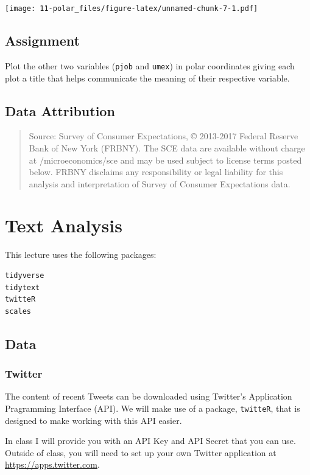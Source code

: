 \documentclass[]{book}
\theoremstyle{definition}
\theoremstyle{definition}
\theoremstyle{remark}
\begin{document}
\texttt{[image: 11-polar\_files/figure-latex/unnamed-chunk-7-1.pdf]}

\section{Assignment}\label{assignment-10}

Plot the other two variables (\texttt{pjob} and \texttt{umex}) in polar
coordinates giving each plot a title that helps communicate the meaning
of their respective variable.

\section{Data Attribution}\label{data-attribution}

\begin{quote}
Source: Survey of Consumer Expectations, © 2013-2017 Federal Reserve
Bank of New York (FRBNY). The SCE data are available without charge at
/microeconomics/sce and may be used subject to license terms posted
below. FRBNY disclaims any responsibility or legal liability for this
analysis and interpretation of Survey of Consumer Expectations data.
\end{quote}

\hypertarget{nlp}{\chapter{Text Analysis}\label{nlp}}

This lecture uses the following packages:

\begin{verbatim}
tidyverse
tidytext
twitteR
scales
\end{verbatim}

\section{Data}\label{data-9}

\subsection{Twitter}\label{twitter}

The content of recent Tweets can be downloaded using Twitter's
Application Pragramming Interface (API). We will make use of a package,
\texttt{twitteR}, that is designed to make working with this API easier.

In class I will provide you with an API Key and API Secret that you can
use. Outside of class, you will need to set up your own Twitter
application at \url{https://apps.twitter.com}.
\end{document}
